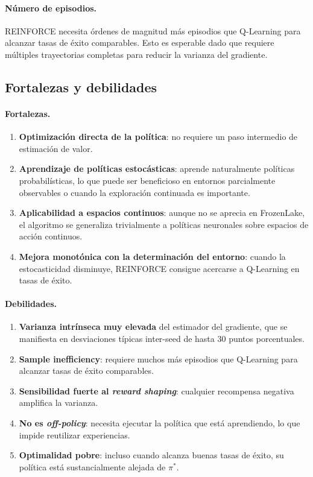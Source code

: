 \documentclass[11pt,a4paper]{article}
\begin{document}
\paragraph{Número de episodios.} REINFORCE necesita órdenes de magnitud más episodios que Q-Learning para alcanzar tasas de éxito comparables. Esto es esperable dado que requiere múltiples trayectorias completas para reducir la varianza del gradiente.

\subsection{Fortalezas y debilidades}

\paragraph{Fortalezas.}
\begin{enumerate}
  \item \textbf{Optimización directa de la política}: no requiere un paso intermedio de estimación de valor.
  \item \textbf{Aprendizaje de políticas estocásticas}: aprende naturalmente políticas probabilísticas, lo que puede ser beneficioso en entornos parcialmente observables o cuando la exploración continuada es importante.
  \item \textbf{Aplicabilidad a espacios continuos}: aunque no se aprecia en FrozenLake, el algoritmo se generaliza trivialmente a políticas neuronales sobre espacios de acción continuos.
  \item \textbf{Mejora monotónica con la determinación del entorno}: cuando la estocasticidad disminuye, REINFORCE consigue acercarse a Q-Learning en tasas de éxito.
\end{enumerate}

\paragraph{Debilidades.}
\begin{enumerate}
  \item \textbf{Varianza intrínseca muy elevada} del estimador del gradiente, que se manifiesta en desviaciones típicas inter-seed de hasta 30 puntos porcentuales.
  \item \textbf{Sample inefficiency}: requiere muchos más episodios que Q-Learning para alcanzar tasas de éxito comparables.
  \item \textbf{Sensibilidad fuerte al \emph{reward shaping}}: cualquier recompensa negativa amplifica la varianza.
  \item \textbf{No es \emph{off-policy}}: necesita ejecutar la política que está aprendiendo, lo que impide reutilizar experiencias.
  \item \textbf{Optimalidad pobre}: incluso cuando alcanza buenas tasas de éxito, su política está sustancialmente alejada de $\pi^{\ast}$.
\end{enumerate}
\end{document}
